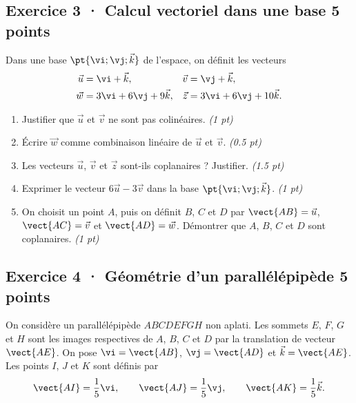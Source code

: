 \mxnewpage{}

\subsection*{Exercice 3 · Calcul vectoriel dans une base \hfill 5 points}Dans une base $\pt{\vi;\vj;\vec k}$ de l'espace, on définit les vecteurs
\[\begin{aligned}\vec u&=\vi+\vec k,&\vec v&=\vj+\vec k,\\
\vec w&=3\vi+6\vj+9\vec k,&\vec z&=3\vi+6\vj+10\vec k.\end{aligned}\]

\begin{enumerate}

\item Justifier que $\vec u$ et $\vec v$ ne sont pas colinéaires. \hfill\textit{(1 pt)}

\item Écrire $\vec w$ comme combinaison linéaire de $\vec u$ et $\vec v$. \hfill\textit{(\num{0,5} pt)}

\item Les vecteurs $\vec u$, $\vec v$ et $\vec z$ sont-ils coplanaires ? Justifier. \hfill\textit{(\num{1,5} pt)}

\item Exprimer le vecteur $6\vec u-3\vec v$ dans la base $\pt{\vi;\vj;\vec k}$. \hfill\textit{(1 pt)}

\item On choisit un point $A$, puis on définit $B$, $C$ et $D$ par $\vect{AB}=\vec u$, $\vect{AC}=\vec v$ et $\vect{AD}=\vec w$. Démontrer que $A$, $B$, $C$ et $D$ sont coplanaires. \hfill\textit{(1 pt)}

\end{enumerate}

\subsection*{Exercice 4 · Géométrie d'un parallélépipède \hfill 5 points}On considère un parallélépipède $ABCDEFGH$ non aplati. Les sommets $E$, $F$, $G$ et $H$ sont les images respectives de $A$, $B$, $C$ et $D$ par la translation de vecteur $\vect{AE}$.
On pose $\vi=\vect{AB}$, $\vj=\vect{AD}$ et $\vec k=\vect{AE}$.
Les points $I$, $J$ et $K$ sont définis par
\[\vect{AI}=\frac1{5}\vi,\qquad\vect{AJ}=\frac1{5}\vj,\qquad\vect{AK}=\frac1{5}\vec k.\]

